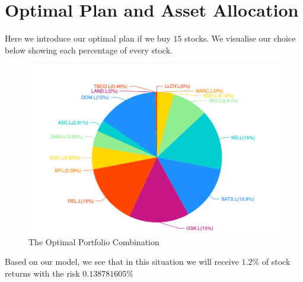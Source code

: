 

\section{Optimal Plan and Asset Allocation}

Here we introduce our optimal plan if we buy $15$ stocks. We visualise our choice below showing each percentage of every stock.

\begin{figure}[htp]
    \includegraphics[width=15cm]{./optimal.png}
    \caption{The Optimal Portfolio Combination}
    \label{optimal}
\end{figure}

Based on our model, we see that in this situation we will receive $1.2\%$ of stock returns with the risk $0.138781605\%$

\newpage